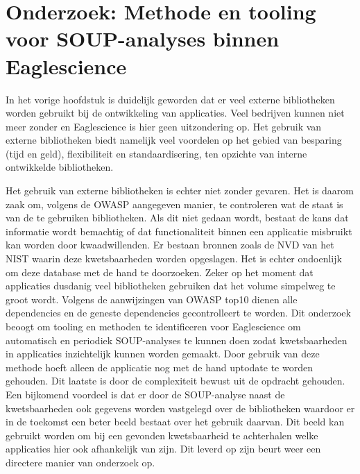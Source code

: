 \chapter{Onderzoek: Methode en tooling voor SOUP-analyses binnen Eaglescience}\label{ch:onderzoek-tool-methode}
In het vorige hoofdstuk is duidelijk geworden dat er veel externe bibliotheken worden gebruikt bij de ontwikkeling van applicaties. Veel bedrijven kunnen niet meer zonder en Eaglescience is hier geen uitzondering op. Het gebruik van externe bibliotheken biedt namelijk veel voordelen op het gebied van besparing (tijd en geld), flexibiliteit en standaardisering, ten opzichte van interne ontwikkelde bibliotheken.

Het gebruik van externe bibliotheken is echter niet zonder gevaren. Het is daarom zaak om, volgens de OWASP aangegeven manier, te controleren wat de staat is van de te gebruiken bibliotheken. Als dit niet gedaan wordt, bestaat de kans dat informatie wordt bemachtig of dat functionaliteit binnen een applicatie misbruikt kan worden door kwaadwillenden. Er bestaan bronnen zoals de NVD van het NIST waarin deze kwetsbaarheden worden opgeslagen. Het is echter ondoenlijk om deze database met de hand te doorzoeken. Zeker op het moment dat applicaties dusdanig veel bibliotheken gebruiken dat het volume simpelweg te groot wordt. Volgens de aanwijzingen van OWASP top10 dienen alle dependencies en de geneste dependencies gecontrolleert te worden.
Dit onderzoek beoogt om tooling en methoden te identificeren voor Eaglescience om automatisch en periodiek SOUP-analyses te kunnen doen zodat kwetsbaarheden in applicaties inzichtelijk kunnen worden gemaakt. Door gebruik van deze methode hoeft alleen de applicatie nog met de hand up\-to\-date te worden gehouden. Dit laatste is door de complexiteit bewust uit de opdracht gehouden. Een bijkomend voordeel is dat er door de SOUP-analyse naast de kwetsbaarheden ook gegevens worden vastgelegd over de bibliotheken waardoor er in de toekomst een beter beeld bestaat over het gebruik daarvan. Dit beeld kan gebruikt worden om bij een gevonden kwetsbaarheid te achterhalen welke applicaties hier ook afhankelijk van zijn. Dit leverd op zijn beurt weer een directere manier van onderzoek op.

